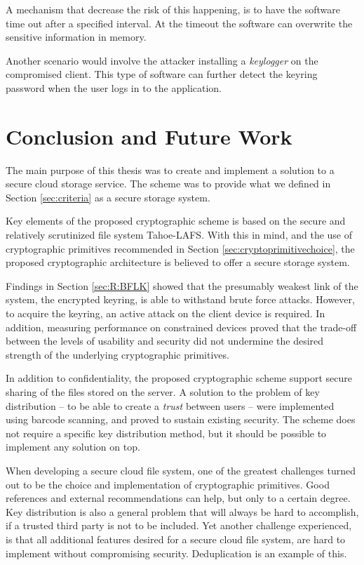 \documentclass[pdftex,english,10pt,b5paper,twoside]{book}
\begin{document}
A mechanism that decrease the risk of this happening, is to have the software
time out after a specified interval. At the timeout the software can overwrite
the sensitive information in memory.

Another scenario would involve the attacker installing a \emph{keylogger} on
the compromised client. This type of software can further detect the keyring
password when the user logs in to the application.

\chapter{Conclusion and Future Work}
\label{ch:conclusion}

The main purpose of this thesis was to create and implement a solution to a
secure cloud storage service. The scheme was to provide what we defined in
Section \ref{sec:criteria} as a secure storage system.

Key elements of the proposed cryptographic scheme is based on the secure and
relatively scrutinized file system Tahoe-\ac{LAFS}. With this in mind, and the
use of cryptographic primitives recommended in Section
\ref{sec:cryptoprimitivechoice}, the proposed cryptographic architecture is
believed to offer a secure storage system.

Findings in Section \ref{sec:R:BFLK} showed that the presumably weakest link of
the system, the encrypted keyring, is able to withstand brute force attacks.
However, to acquire the keyring, an active attack on the client device is
required. In addition, measuring performance on constrained devices proved that
the trade-off between the levels of usability and security did not undermine
the desired strength of the underlying cryptographic primitives.

In addition to confidentiality, the proposed cryptographic scheme support
secure sharing of the files stored on the server. A solution to the problem of
key distribution -- to be able to create a \emph{trust} between users -- were
implemented using barcode scanning, and proved to sustain existing security.
The scheme does not require a specific key distribution method, but it should
be possible to implement any solution on top.

When developing a secure cloud file system, one of the greatest challenges
turned out to be the choice and implementation of cryptographic primitives.
Good references and external recommendations can help, but only to a certain
degree. Key distribution is also a general problem that will always be hard to
accomplish, if a trusted third party is not to be included. Yet another
challenge experienced, is that all additional features desired for a secure
cloud file system, are hard to implement without compromising security.
Deduplication is an example of this.
\end{document}
